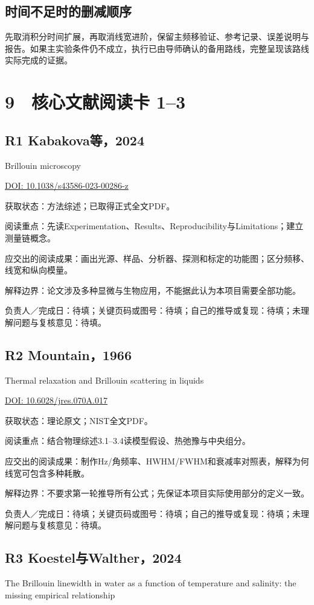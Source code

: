 \documentclass[UTF8,a4paper,11pt,fontset=fandol]{ctexart}
\begin{document}
\subsection*{时间不足时的删减顺序}
先取消积分时间扩展，再取消线宽进阶，保留主频移验证、参考记录、误差说明与报告。如果主实验条件仍不成立，执行已由导师确认的备用路线，完整呈现该路线实际完成的证据。

\clearpage
\section*{9　核心文献阅读卡 1–3}
\subsection*{R1 Kabakova等，2024}
Brillouin microscopy

\noindent\href{https://doi.org/10.1038/s43586-023-00286-z}{DOI: 10.1038/s43586-023-00286-z}\par\smallskip
获取状态：方法综述；已取得正式全文PDF。

阅读重点：先读Experimentation、Results、Reproducibility与Limitations；建立测量链概念。

应交出的阅读成果：画出光源、样品、分析器、探测和标定的功能图；区分频移、线宽和纵向模量。

解释边界：论文涉及多种显微与生物应用，不能据此认为本项目需要全部功能。

负责人／完成日：待填；关键页码或图号：待填；自己的推导或复现：待填；未理解问题与复核意见：待填。

\subsection*{R2 Mountain，1966}
Thermal relaxation and Brillouin scattering in liquids

\noindent\href{https://doi.org/10.6028/jres.070A.017}{DOI: 10.6028/jres.070A.017}\par\smallskip
获取状态：理论原文；NIST全文PDF。

阅读重点：结合物理综述3.1–3.4读模型假设、热弛豫与中央组分。

应交出的阅读成果：制作Hz/角频率、HWHM/FWHM和衰减率对照表，解释为何线宽可包含多种耗散。

解释边界：不要求第一轮推导所有公式；先保证本项目实际使用部分的定义一致。

负责人／完成日：待填；关键页码或图号：待填；自己的推导或复现：待填；未理解问题与复核意见：待填。

\subsection*{R3 Koestel与Walther，2024}
The Brillouin linewidth in water as a function of temperature and salinity: the missing empirical relationship
\end{document}
